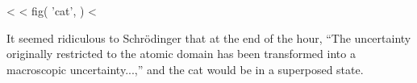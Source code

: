 <%
<%
  fig(
    'cat',
  )
<%

\noindent It seemed ridiculous to Schr\"odinger that at the end of
the hour, ``The uncertainty originally restricted to the atomic domain
has been transformed into a macroscopic uncertainty...,'' and the cat
would be in a superposed state.

